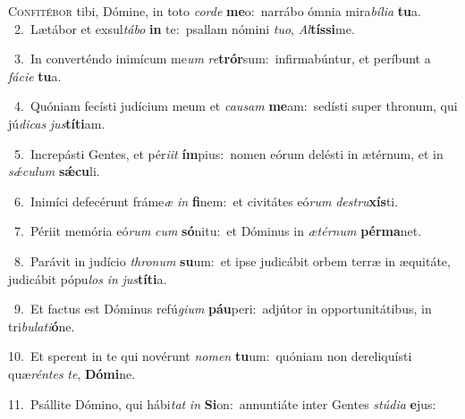 \lettrine{\initial\textcolor{\initialcolor}{C}}{onfitébor} tibi, Dómine, in toto \textit{cor}\-\textit{de} \textbf{me}\-o:~\star narrábo ómnia mira\-\textit{bí}\-\textit{li}\textit{a} \textbf{tu}\-a.\\
{\numbfont\textcolor{\numbcolor}{~2.}}~Lætábor et exsul\-\textit{tá}\-\textit{bo} \textbf{in} te:~\star psallam nómini \textit{tu}\-\textit{o}, \textit{Al}\-\textbf{tís}\textbf{si}me.\par
{\numbfont\textcolor{\numbcolor}{~3.}}~In converténdo inimícum me\textit{um} \textit{re}\-\textbf{trór}sum:~\star infirmabúntur, et períbunt a \textit{fá}\-\textit{ci}\textit{e} \textbf{tu}\-a.\par
{\numbfont\textcolor{\numbcolor}{~4.}}~Quóniam fecísti judícium meum et \textit{cau}\-\textit{sam} \textbf{me}\-am:~\star sedísti super thronum, qui jú\-\textit{di}\-\textit{cas} \textit{jus}\-\textbf{tí}\textbf{ti}am.\par
{\numbfont\textcolor{\numbcolor}{~5.}}~Increpásti Gentes, et pér\-\textit{i}\-\textit{it} \textbf{ím}\-pius:~\star nomen eórum delésti in ætérnum, et in \textit{sǽ}\-\textit{cu}\textit{lum} \textbf{sǽ}\-\textbf{cu}li.\par
{\numbfont\textcolor{\numbcolor}{~6.}}~Inimíci defecérunt fráme\textit{æ} \textit{in} \textbf{fi}\-nem:~\star et civitátes eó\textit{rum} \textit{de}\-\textit{stru}\textbf{xís}ti.\par
{\numbfont\textcolor{\numbcolor}{~7.}}~Périit memória eó\textit{rum} \textit{cum} \textbf{só}\-nitu:~\star et Dóminus in \textit{æ}\-\textit{tér}\textit{num} \textbf{pér}\-\textbf{ma}net.\par
{\numbfont\textcolor{\numbcolor}{~8.}}~Parávit in judício \textit{thro}\-\textit{num} \textbf{su}\-um:~\star et ipse judicábit orbem terræ in æquitáte, judicábit pópu\textit{los} \textit{in} \textit{jus}\-\textbf{tí}\textbf{ti}a.\par
{\numbfont\textcolor{\numbcolor}{~9.}}~Et factus est Dóminus refú\-\textit{gi}\-\textit{um} \textbf{páu}\-peri:~\star adjútor in opportunitátibus, in tri\-\textit{bu}\-\textit{la}\textit{ti}\textbf{ó}ne.\par
{\numbfont\textcolor{\numbcolor}{10.}}~Et sperent in te qui novérunt \textit{no}\-\textit{men} \textbf{tu}\-um:~\star quóniam non dereliquísti quæ\-\textit{rén}\-\textit{tes} \textit{te}\-, \textbf{Dó}\-\textbf{mi}ne.\par
{\numbfont\textcolor{\numbcolor}{11.}}~Psállite Dómino, qui hábi\textit{tat} \textit{in} \textbf{Si}\-on:~\star annuntiáte inter Gentes \textit{stú}\-\textit{di}\textit{a} \textbf{e}\-jus:\par

